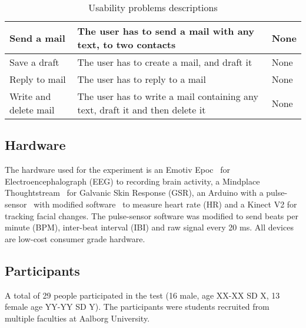 \begin{table}[h]
\begin{tabular}[c]{|l|p{80pt}|p{80pt}|}
    \small{Send a mail}           & \small{The user has to send a mail with any text, to two contacts}                                                                             & \small{None}                                                                                             \\ \hline
    \small{Save a draft}          & \small{The user has to create a mail, and draft it}                                                                                            & \small{None}                                                                                             \\ \hline
    \small{Reply to mail}         & \small{The user has to reply to a mail}                                                                                                        & \small{None}                                                                                             \\ \hline
    \small{Write and delete mail} & \small{The user has to write a mail containing any text, draft it and then delete it}                                                          & \small{None}                                                                                             \\ \hline
  \end{tabular}
  \caption{Usability problems descriptions}
  \label{tab:ups-desc}
\end{table}

\subsection{Hardware}
The hardware used for the experiment is an Emotiv Epoc~\cite{emotiv_epoc_website} for Electroencephalograph (EEG) to recording brain activity, a Mindplace Thoughtstream~\cite{thoughtstream} for Galvanic Skin Response (GSR), an Arduino with a pulse-sensor~\cite{pulsesensor} with modified software~\cite{pulsesensorgit} to measure heart rate (HR) and a Kinect V2\cite{kinect_specs3} for tracking facial changes.
The pulse-sensor software was modified to send beats per minute (BPM), inter-beat interval (IBI) and raw signal every 20 ms.
All devices are low-cost consumer grade hardware.

\subsection{Participants}
A total of 29 people participated in the test (16 male, age XX-XX SD X, 13 female age YY-YY SD Y).
The participants were students recruited from multiple faculties at Aalborg University.

